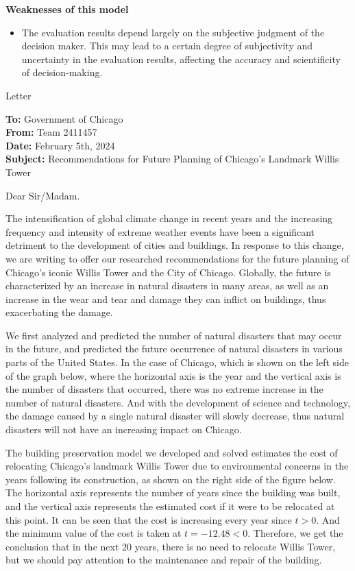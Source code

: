 \documentclass[12pt]{article}  %
\begin{document}
\textbf{Weaknesses of this model}
\begin{itemize}
    \item The evaluation results depend largely on the subjective judgment of the decision maker. This may lead to a certain degree of subjectivity and uncertainty in the evaluation results, affecting the accuracy and scientificity of decision-making.
 \end{itemize}



\begin{letter}{Letter}
\begin{flushleft}  %
\textbf{To:} Government of Chicago\\
\textbf{From:} Team 2411457\\
\textbf{Date:} February 5th, 2024\\
\textbf{Subject:} Recommendations for Future Planning of Chicago's Landmark Willis Tower
\end{flushleft}

Dear Sir/Madam.

The intensification of global climate change in recent years and the increasing frequency and intensity of extreme weather events have been a significant detriment to the development of cities and buildings. In response to this change, we are writing to offer our researched recommendations for the future planning of Chicago's iconic Willis Tower and the City of Chicago.
Globally, the future is characterized by an increase in natural disasters in many areas, as well as an increase in the wear and tear and damage they can inflict on buildings, thus exacerbating the damage.

We first analyzed and predicted the number of natural disasters that may occur in the future, and predicted the future occurrence of natural disasters in various parts of the United States. In the case of Chicago, which is shown on the left side of the graph below, where the horizontal axis is the year and the vertical axis is the number of disasters that occurred, there was no extreme increase in the number of natural disasters. And with the development of science and technology, the damage caused by a single natural disaster will slowly decrease, thus natural disasters will not have an increasing impact on Chicago.

The building preservation model we developed and solved estimates the cost of relocating Chicago's landmark Willis Tower due to environmental concerns in the years following its construction, as shown on the right side of the figure below. The horizontal axis represents the number of years since the building was built, and the vertical axis represents the estimated cost if it were to be relocated at this point. It can be seen that the cost is increasing every year since $t>0$. And the minimum value of the cost is taken at $t=-12.48<0$. Therefore, we get the conclusion that in the next 20 years, there is no need to relocate Willis Tower, but we should pay attention to the maintenance and repair of the building.


\end{letter}
\end{document}
